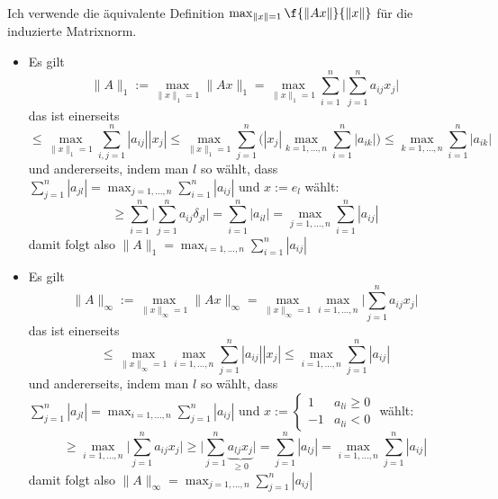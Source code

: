 \documentclass{mywork}
\begin{document}
\setcounter{aufgabe}{2}
\begin{aufgabe}~

	Ich verwende die äquivalente Definition $\max_{\|x\|=1}\f {\|Ax\|}{\|x\|}$ für die induzierte Matrixnorm.
	\begin{itemize}
		\item
			Es gilt
			\[
				\|A\|_1 := \max_{\|x\|_1=1} \|Ax\|_1 = \max_{\|x\|_1=1}\sum_{i=1}^n \Big| \sum_{j=1}^n a_{ij} x_j \Big|
			\]
			das ist einerseits
			\[
				\le \max_{\|x\|_1=1} \sum_{i,j=1}^n |a_{ij}| |x_j| \le \max_{\|x\|_1=1} \sum_{j=1}^n \bigg( |x_j| \max_{k=1,\dotsc,n} \sum_{i=1}^n |a_{ik}| \bigg) \le \max_{k=1,\dotsc,n} \sum_{i=1}^n |a_{ik}|
			\]
			und andererseits, indem man $l$ so wählt, dass $\displaystyle \sum_{j=1}^n |a_{jl}| = \max_{j=1,\dotsc,n} \sum_{i=1}^n |a_{ij}|$ und $x := e_l$ wählt:
			\[
				\ge \sum_{i=1}^n \Big| \sum_{j=1}^n a_{ij} \delta_{jl} \Big| = \sum_{i=1}^n |a_{il} | = \max_{j=1,\dotsc,n} \sum_{i=1}^n |a_{ij}|
			\]
			damit folgt also $\displaystyle \|A\|_1 = \max_{i=1,\dotsc,n} \sum_{i=1}^n |a_{ij}|$
		\item
			Es gilt
			\[
				\|A\|_\infty := \max_{\|x\|_\infty=1} \|Ax\|_\infty = \max_{\|x\|_\infty=1}\max_{i=1,\dotsc,n} \Big| \sum_{j=1}^n a_{ij} x_j \Big|
			\]
			das ist einerseits
			\[
				\le \max_{\|x\|_\infty=1} \max_{i=1,\dotsc,n} \sum_{j=1}^n |a_{ij}||x_j|
				\le \max_{i=1,\dotsc,n} \sum_{j=1}^n |a_{ij}|
			\]
			und andererseits, indem man $l$ so wählt, dass $\displaystyle \sum_{j=1}^n |a_{jl}| = \max_{i=1,\dotsc,n} \sum_{j=1}^n |a_{ij}|$ und $x := \begin{cases}1 & a_{li} \ge 0 \\ -1 & a_{li} < 0 \end{cases}$ wählt:
			\[
				\ge \max_{i=1,\dotsc,n} \Big| \sum_{j=1}^n a_{ij} x_j \Big|
				\ge \Big| \sum_{j=1}^n \underbrace{a_{lj} x_j}_{\ge 0} \Big| = \sum_{j=1}^n |a_{lj}| = \max_{i=1,\dotsc,n} \sum_{j=1}^n |a_{ij}|
			\]
			damit folgt also $\displaystyle \|A\|_\infty = \max_{j=1,\dotsc,n} \sum_{j=1}^n |a_{ij}|$

	\end{itemize}
\end{aufgabe}
\end{document}
